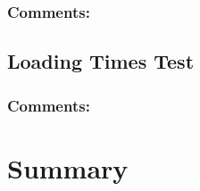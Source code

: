 \documentclass[11pt,a4paper]{article}
\begin{document}
\subsubsection{Comments:}

\subsection{Loading Times Test}
\begin{figure}[H]
    \centering
\end{figure}

\subsubsection{Comments:}
\section{Summary}





\end{document}
